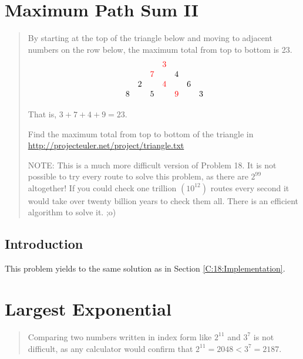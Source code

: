 \documentclass[oneside,12pt]{book}   	%
\newcounter{ex}
\newcounter{pr}
\theoremstyle{definition}
\begin{document}
\begin{spacing}{1.618}
			
			
			
	\chapter{Maximum Path Sum II}
	
		\begin{quote}
			By starting at the top of the triangle below and moving to adjacent numbers on the row below, the maximum total from top to bottom is 23.
			\begin{alignat}{4}
				\begin{array}{ccccccc}
					&&&\textcolor{red}{3}&&& \\
					&&\textcolor{red}{7}&& 4&& \\
					&2&&\textcolor{red}{4}&& 6& \\
					8 && 5 && \textcolor{red}{9} && 3
				\end{array} \label{E:67:1}
			\end{alignat}

			That is, $3 + 7 + 4 + 9 = 23$.

			Find the maximum total from top to bottom of the triangle in \url{http://projecteuler.net/project/triangle.txt}

			NOTE: This is a much more difficult version of Problem 18. It is not possible to try every route to solve this problem, as there are $2^99$ altogether! If you could check one trillion $\left(10^12\right)$ routes every second it would take over twenty billion years to check them all. There is an efficient algorithm to solve it. ;o)
		\end{quote}

		\section{Introduction}
		
			This problem yields to the same solution as in Section \ref{C:18:Implementation}. 

	\chapter{Largest Exponential}
	
		\begin{quote}
			Comparing two numbers written in index form like $2^{11}$ and $3^7$ is not difficult, as any calculator would confirm that $2^{11} = 2048 < 3^7 = 2187$.


\end{quote}
\end{spacing}
\end{document}
